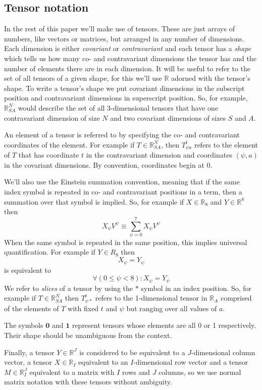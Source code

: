 \documentclass{article}
\begin{document}
\subsection{Tensor notation}

In the rest of this paper we'll make use of tensors. These are just arrays of numbers, like vectors or matrices, but arranged in any number of dimensions. Each dimension is either \textit{covariant} or \textit{contravariant} and each tensor has a \textit{shape} which tells us how many co- and contravariant dimensions the tensor has and the number of elements there are in each dimension. It will be useful to refer to the set of all tensors of a given shape, for this we'll use $\mathbb{R}$ adorned with the tensor's shape. To write a tensor's shape we put covariant dimensions in the subscript position and contravariant dimensions in superscript position. So, for example, $\mathbb{R}^N_{SA}$ would describe the set of all 3-dimensional tensors that have one contravariant dimension of size $N$ and two covariant dimensions of sizes $S$ and $A$.

An element of a tensor is referred to by specifying the co- and contravariant coordinates of the element. For example if $T \in \mathbb{R}^N_{SA}$, then $T^t_{\psi a}$ refers to the element of $T$ that has coordinate $t$ in the contravariant dimension and coordinates $(\psi,a)$ in the covariant dimensions. By convention, coordinates begin at 0.

We'll also use the Einstein summation convention, meaning that if the same index symbol is repeated in co- and contravariant positions in a term, then a summation over that symbol is implied. So, for example if $X \in \mathbb{R}_8$ and $Y \in \mathbb{R}^8$ then
\[
X_\psi V^\psi \equiv \sum_{\psi=0}^7 X_\psi  V^\psi
\]
When the same symbol is repeated in the same position, this implies universal quantification. For example if $Y\in R_8$ then
\[
X_\psi = Y_\psi 
\]
is equivalent to
\[
\forall (0 \le \psi < 8) : X_\psi = Y_\psi 
\]
We refer to \textit{slices} of a tensor by using the $*$ symbol in an index position. So, for example if $T \in \mathbb{R}^N_{SA}$ then $T^t_{\psi *}$ refers to the 1-dimensional tensor in $\mathbb{R}_A$ comprised of the elements of $T$ with fixed $t$ and $\psi$ but ranging over all values of $a$.

The symbols $\mathbf{0}$ and $\mathbf{1}$ represent tensors whose elements are all 0 or 1 respectively. Their shape should be unambiguous from the context.

Finally, a tensor $Y\in \mathbb{R}^J$ is considered to be equivalent to a $J$-dimensional column vector, a tensor  $X\in \mathbb{R}_I$ equivalent to an $I$-dimensional row vector and a tensor $M \in \mathbb{R}^J_I$ equivalent to a matrix with  $I$ rows and $J$ columns, so we use normal matrix notation with these tensors without ambiguity.
\end{document}
